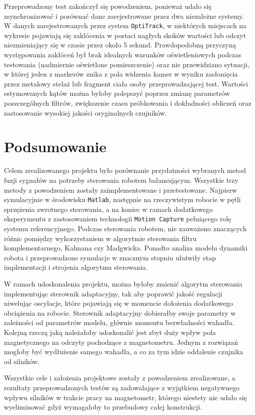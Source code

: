 Przeprowadzony test zakończył się powodzeniem, ponieważ udało się zsynchronizować i porównać dane zarejestrowane przez dwa niezależne systemy. W danych zarejestrowanych przez system \texttt{OptiTrack}, w niektórych miejscach na wykresie pojawiają się zakłócenia w postaci nagłych skoków wartości lub odczyt niezmieniający się w czasie przez około 5 sekund. Prawdopodobną przyczyną występowania zakłóceń był brak idealnych warunków oświetleniowych podczas testowania (nadmiernie oświetlone pomieszczenie) oraz nie przewidziano sytuacji, w której jeden z markerów znika z pola widzenia kamer w wyniku zasłonięcia przez metalowy stelaż lub fragment ciała osoby przeprowadzającej test. Wartości estymowanych kątów można byłoby polepszyć poprzez zmianę parametrów poszczególnych filtrów, zwiększenie czasu próbkowania i dokładności obliczeń oraz zastosowanie wysokiej jakości oryginalnych czujników. 

\section{Podsumowanie}

Celem zrealizowanego projektu było porównanie przydatności wybranych metod fuzji sygnałów na potrzeby sterowania robotem balansującym. Wszystkie trzy metody z powodzeniem zostały zaimplementowane i przetestowane. Najpierw symulacyjnie w środowisku \texttt{Matlab}, następnie na rzeczywistym robocie w pętli sprzężenia zwrotnego sterowania, a na koniec w ramach dodatkowego eksperymentu z zastosowaniem technologii \texttt{Motion Capture} pełniącego rolę systemu referencyjnego. Podczas sterowania robotem, nie zauważono znaczących różnic pomiędzy wykorzystaniem w algorytmie sterowania filtru komplementarnego, Kalmana czy Madgwicka. Ponadto analiza modelu dynamiki robota i przeprowadzone symulacje w znacznym stopniu ułatwiły etap implementacji i strojenia algorytmu sterowania.

W ramach udoskonalenia projektu, można byłoby zmienić algorytm sterowania implementując sterownik adaptacyjny, tak aby poprawić jakość regulacji niwelując oscylacje, które pojawiają się w momencie dołożenia dodatkowego obciążenia na robocie. Sterownik adaptacyjny dobierałby swoje parametry w zależności od parametrów modelu, głównie momentu bezwładności wahadła. Kolejną rzeczą jaką należałoby udoskonalić jest zbyt duży wpływ pola magnetycznego na odczyty pochodzące z magnetometru. Jednym z rozwiązań mogłoby być wydłużenie samego wahadła, a co za tym idzie oddalenie czujnika od silników. 

Wszystkie cele i założenia projektowe zostały z powodzeniem zrealizowane, a rezultaty przeprowadzonych testów są zadowalające z wyjątkiem negatywnego wpływu silników w trakcie pracy na magnetometr, którego niestety nie udało się wyeliminować gdyż wymagałoby to przebudowy całej konstrukcji.

